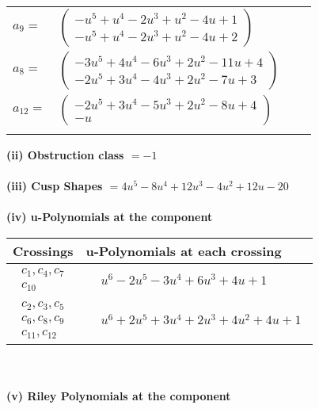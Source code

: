 \documentclass[1p]{elsarticle_modified}
\theoremstyle{definition}
\begin{document}
\begin{tabular}{m{7pt} m{180pt} m{7pt} m{180pt} }
\flushright $a_{9}=$&$\begin{pmatrix}- u^5+u^4-2 u^3+u^2-4 u+1\\- u^5+u^4-2 u^3+u^2-4 u+2\end{pmatrix}$ \\
\flushright $a_{8}=$&$\begin{pmatrix}-3 u^5+4 u^4-6 u^3+2 u^2-11 u+4\\-2 u^5+3 u^4-4 u^3+2 u^2-7 u+3\end{pmatrix}$ \\
\flushright $a_{12}=$&$\begin{pmatrix}-2 u^5+3 u^4-5 u^3+2 u^2-8 u+4\\- u\end{pmatrix}$\\&\end{tabular}
\flushleft \textbf{(ii) Obstruction class $= -1$}\\~\\
\flushleft \textbf{(iii) Cusp Shapes $= 4 u^5-8 u^4+12 u^3-4 u^2+12 u-20$}\\~\\
\newpage\renewcommand{\arraystretch}{1}
\flushleft \textbf{(iv) u-Polynomials at the component}\newline \\
\begin{tabular}{m{50pt}|m{274pt}}
Crossings & \hspace{64pt}u-Polynomials at each crossing \\
\hline $$\begin{aligned}c_{1},c_{4},c_{7}\\c_{10}\end{aligned}$$&$\begin{aligned}
&u^6-2 u^5-3 u^4+6 u^3+4 u+1
\end{aligned}$\\
\hline $$\begin{aligned}c_{2},c_{3},c_{5}\\c_{6},c_{8},c_{9}\\c_{11},c_{12}\end{aligned}$$&$\begin{aligned}
&u^6+2 u^5+3 u^4+2 u^3+4 u^2+4 u+1
\end{aligned}$\\
\hline
\end{tabular}\\~\\
\newpage\renewcommand{\arraystretch}{1}
\flushleft \textbf{(v) Riley Polynomials at the component}\newline \\
\end{document}

